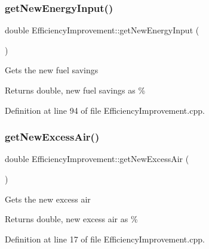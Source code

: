 \subsubsection{\texorpdfstring{get\+New\+Energy\+Input()}{getNewEnergyInput()}\hspace{0.1cm}{\footnotesize\ttfamily [3/3]}}
{\footnotesize\ttfamily double Efficiency\+Improvement\+::get\+New\+Energy\+Input (\begin{DoxyParamCaption}{ }\end{DoxyParamCaption})}

Gets the new fuel savings

\begin{DoxyReturn}{Returns}
double, new fuel savings as \% 
\end{DoxyReturn}


Definition at line 94 of file Efficiency\+Improvement.\+cpp.

\mbox{\label{class_efficiency_improvement_afda194c72ccc7332ba4331f87f971b77}} 
\subsubsection{\texorpdfstring{get\+New\+Excess\+Air()}{getNewExcessAir()}\hspace{0.1cm}{\footnotesize\ttfamily [1/3]}}
{\footnotesize\ttfamily double Efficiency\+Improvement\+::get\+New\+Excess\+Air (\begin{DoxyParamCaption}{ }\end{DoxyParamCaption})}

Gets the new excess air

\begin{DoxyReturn}{Returns}
double, new excess air as \% 
\end{DoxyReturn}


Definition at line 17 of file Efficiency\+Improvement.\+cpp.

\mbox{\label{class_efficiency_improvement_afda194c72ccc7332ba4331f87f971b77}} 
